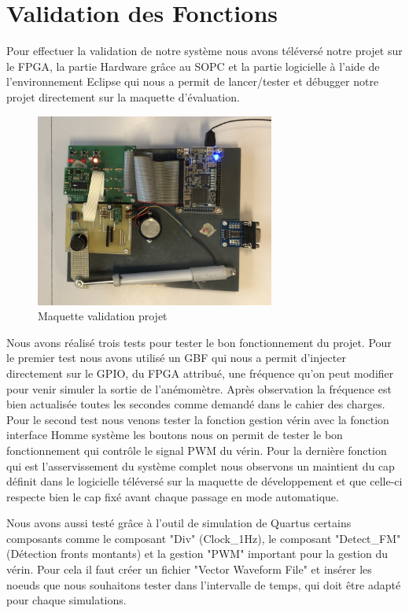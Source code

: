 \section{Validation des Fonctions}
Pour effectuer la validation de notre système nous avons téléversé notre projet sur le FPGA, la partie Hardware grâce au SOPC et la partie logicielle à l'aide de l'environnement Eclipse qui nous a permit de lancer/tester et débugger notre projet directement sur la maquette d'évaluation.

\begin{figure}[h]
    \begin{center}
      \includegraphics[width=0.7\textwidth]{images/maquette.jpg}
      \caption{Maquette validation projet}
    \end{center}
  \end{figure}

  Nous avons réalisé trois tests pour tester le bon fonctionnement du projet. Pour le premier test nous avons utilisé un GBF qui nous a permit d'injecter directement sur le GPIO, du FPGA attribué, une fréquence qu'on peut modifier pour venir simuler la sortie de l'anémomètre. Après observation la fréquence est bien actualisée toutes les secondes comme demandé dans le cahier des charges. Pour le second test nous venons tester la fonction gestion vérin avec la fonction interface Homme système les boutons nous on permit de tester le bon fonctionnement qui contrôle le signal PWM du vérin. Pour la dernière fonction qui est l'asservissement du système complet nous observons un maintient du cap définit dans le logicielle téléversé sur la maquette de développement et que celle-ci respecte bien le cap fixé avant chaque passage en mode automatique.\newline

  Nous avons aussi testé grâce à l'outil de simulation de Quartus certains composants comme le composant "Div" (Clock\_1Hz), le composant "Detect\_FM" (Détection fronts montants) et la gestion "PWM" important pour la gestion du vérin. Pour cela il faut créer un fichier "Vector Waveform File" et insérer les noeuds que nous souhaitons tester dans l'intervalle de temps, qui doit être adapté pour chaque simulations.
  \newpage
